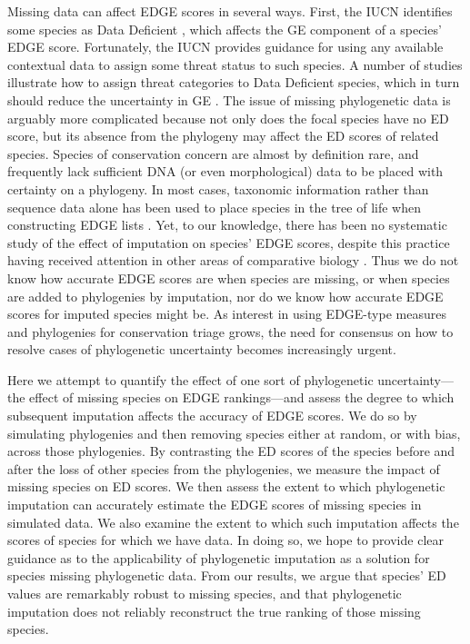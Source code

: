 \documentclass[10pt,english]{article}
\begin{document}
Missing data can affect EDGE scores in several ways. First, the IUCN identifies
some species as Data Deficient \autocite{Iucn2001, Iucn2008}, which affects the
GE component of a species' EDGE score. Fortunately, the IUCN provides guidance
for using any available contextual data to assign some threat status to such
species. A number of studies illustrate how to assign threat categories to Data
Deficient species, which in turn should reduce the uncertainty in GE
\autocite{Good2006, Butchart2010, Morais2013, Dulvy2014}. The issue of missing
phylogenetic data is arguably more complicated because not only does the focal
species have no ED score, but its absence from the phylogeny may affect the ED
scores of related species. Species of conservation concern are almost by
definition rare, and frequently lack sufficient DNA (or even morphological) data
to be placed with certainty on a phylogeny. In most cases, taxonomic information
rather than sequence data alone has been used to place species in the tree of
life when constructing EDGE lists \autocite[see][]{Isaac2007, Collen2011,
Isaac2012, Jetz2014, Curnick2015, Stein2018, Gumbs2018, Forest2018}. Yet, to our
knowledge, there has been no systematic study of the effect of imputation on
species’ EDGE scores, despite this practice having received attention in other
areas of comparative biology \autocite{Kuhn2011, Thomas2013, Rabosky2015}. Thus
we do not know how accurate EDGE scores are when species are missing, or when
species are added to phylogenies by imputation, nor do we know how accurate EDGE
scores for imputed species might be. As interest in using EDGE-type measures
and phylogenies for conservation triage grows, the need for consensus on how to
resolve cases of phylogenetic uncertainty becomes increasingly urgent. 

Here we attempt to quantify the effect of one sort of phylogenetic
uncertainty---the effect of missing species on EDGE rankings---and assess the
degree to which subsequent imputation affects the accuracy of EDGE scores. We do
so by simulating phylogenies and then removing species either at random, or with
bias, across those phylogenies. By contrasting the ED scores of the species
before and after the loss of other species from the phylogenies, we measure the
impact of missing species on ED scores. We then assess the extent to which
phylogenetic imputation can accurately estimate the EDGE scores of missing
species in simulated data. We also examine the extent to which such imputation
affects the scores of species for which we have data. In doing so, we hope to
provide clear guidance as to the applicability of phylogenetic imputation as a
solution for species missing phylogenetic data. From our results, we argue that
species' ED values are remarkably robust to missing species, and that
phylogenetic imputation does not reliably reconstruct the true ranking of those
missing species.
\end{document}
